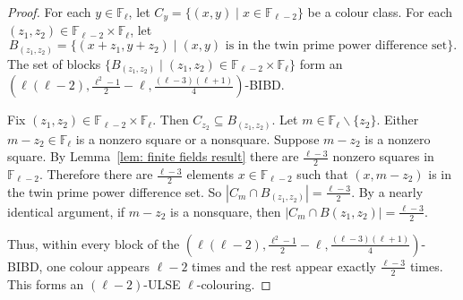 \documentclass[12pt]{article}
\theoremstyle{definition}
\begin{document}
\begin{proof}

    For each $y \in \mathbb{F}_\ell$, let $C_y = \{(x,y) \mid x\in \mathbb{F}_{\ell-2}\}$ be a colour class. For each $(z_1, z_2) \in \mathbb{F}_{\ell-2} \times \mathbb{F}_\ell$, let
    \[B_{(z_1, z_2)} = \{(x+z_1, y+z_2) \mid \text{$(x,y)$ is in the twin prime power difference set}\}.\] The set of blocks $\{B_{(z_1, z_2)} \mid (z_1, z_2) \in \mathbb{F}_{\ell-2} \times \mathbb{F}_\ell\}$ form an $\left(\ell(\ell - 2), \frac{\ell^2 - 1}{2} - \ell, \frac{(\ell - 3)(\ell +1)}{4}\right)$-BIBD.

    Fix $(z_1, z_2) \in \mathbb{F}_{\ell-2} \times \mathbb{F}_\ell$. Then $C_{z_2} \subseteq B_{(z_1, z_2)}$. Let $m\in \mathbb{F}_\ell \backslash \{z_2\}$. Either $m - z_2 \in \mathbb{F}_{\ell}$ is a nonzero square or a nonsquare. Suppose $m-z_2$ is a nonzero square. By Lemma~\ref{lem: finite fields result} there are $\frac{\ell-3}{2}$ nonzero squares in $\mathbb{F}_{\ell-2}$. Therefore there are $\frac{\ell-3}{2}$ elements $x\in \mathbb{F}_{\ell-2}$ such that $(x, m-z_2)$ is in the twin prime power difference set. So $|C_m \cap B_{(z_1, z_2)}| = \frac{\ell-3}{2}$. By a nearly identical argument, if $m - z_2$ is a nonsquare, then $|C_m \cap B{(z_1, z_2)}| = \frac{\ell-3}{2}$. 

    Thus, within every block of the $\left(\ell(\ell - 2), \frac{\ell^2 - 1}{2} - \ell, \frac{(\ell - 3)(\ell +1)}{4}\right)$-BIBD, one colour appears $\ell-2$ times and the rest appear exactly $\frac{\ell-3}{2}$ times. This forms an $(\ell-2)$-ULSE $\ell$-colouring.
\end{proof}
\end{document}
